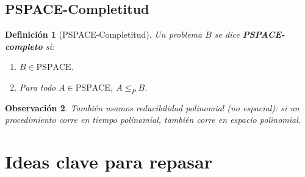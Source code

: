 \documentclass[11pt,a4paper]{article}
\theoremstyle{definicion}
\newtheorem{definicion}{Definici\'on}[section]
\newtheorem{observacion}[definicion]{Observaci\'on}
\newcommand{\redP}{\leq_{P}}
\newcommand{\PSPACE}{\mathrm{PSPACE}}
\begin{document}
\subsection{PSPACE-Completitud}

\begin{definicion}[PSPACE-Completitud]
Un problema $B$ se dice \textbf{PSPACE-completo} si:
\begin{enumerate}
    \item $B \in \PSPACE$.
    \item Para todo $A \in \PSPACE$, $A \redP B$.
\end{enumerate}
\end{definicion}

\begin{observacion}
Tambi\'en usamos \emph{reducibilidad polinomial} (no espacial): si un procedimiento corre en tiempo polinomial, tambi\'en corre en espacio polinomial.
\end{observacion}

\section{Ideas clave para repasar}
\end{document}
